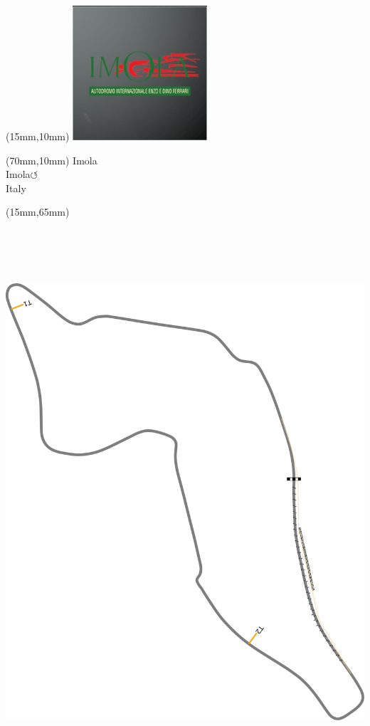 \null\newpage
\begin{textblock*}{50mm}(15mm,10mm)%
\includegraphics[width=50mm]{LG/2015-05-20_00083.png}
\end{textblock*}
\begin{textblock*}{130mm}(70mm,10mm)%
{\fontsize{20}{20}\selectfont Imola\\}
{\fontsize{16}{16}\selectfont Imola\hfill \Large$\circlearrowleft$\\}
{\fontsize{12}{12}\selectfont Italy\\}
\end{textblock*}
\begin{textblock*}{185mm}(15mm,65mm)%
\centering
\mbox{\includegraphics[width=185mm,height=210mm,keepaspectratio]{PT/IMOL.pdf}}
\end{textblock*}
